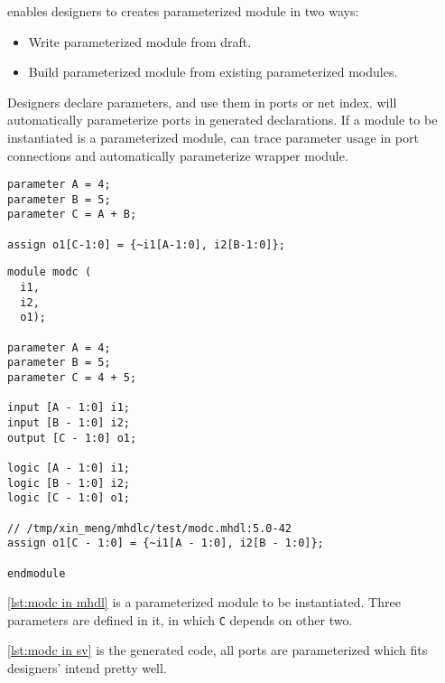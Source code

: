 \mhdl{} enables designers to creates parameterized module in two ways: 
\begin{itemize}
\item Write parameterized module from draft.
\item Build parameterized module from existing parameterized modules. 
\end{itemize}

Designers declare parameters, and use them in ports or net index. \mhdlc{} 
will automatically parameterize ports in generated declarations. If a module 
to be instantiated is a parameterized module, \mhdlc{} can trace parameter usage
in port connections and automatically parameterize wrapper module. 

  \begin{minipage}[t]{.5\textwidth}
    \vspace{0pt}
    \begin{minipage}{\textwidth}
      \begin{lstlisting}[caption={\texttt{modc} in \mhdl{}}, label={lst:modc in mhdl}]
parameter A = 4;
parameter B = 5; 
parameter C = A + B;

assign o1[C-1:0] = {~i1[A-1:0], i2[B-1:0]};
      \end{lstlisting}
    \end{minipage}

    \begin{minipage}{\textwidth}
      \begin{lstlisting}[caption={\texttt{modc} in \sv{}}, label={lst:modc in sv}]
module modc (
  i1, 
  i2, 
  o1);

parameter A = 4;
parameter B = 5;
parameter C = 4 + 5;

input [A - 1:0] i1;
input [B - 1:0] i2;
output [C - 1:0] o1;

logic [A - 1:0] i1;
logic [B - 1:0] i2;
logic [C - 1:0] o1;

// /tmp/xin_meng/mhdlc/test/modc.mhdl:5.0-42
assign o1[C - 1:0] = {~i1[A - 1:0], i2[B - 1:0]};

endmodule
      \end{lstlisting}
    \end{minipage}
  \end{minipage}
  \begin{minipage}[t]{.5\textwidth}
    \vspace{2ex}
    \autoref{lst:modc in mhdl} is a parameterized module to be instantiated. 
    Three parameters are defined in it, in which \texttt{C} depends on other two.

    \autoref{lst:modc in sv} is the generated \sv{} 
    code, all ports are parameterized which fits designers' intend pretty well.
  \end{minipage}



